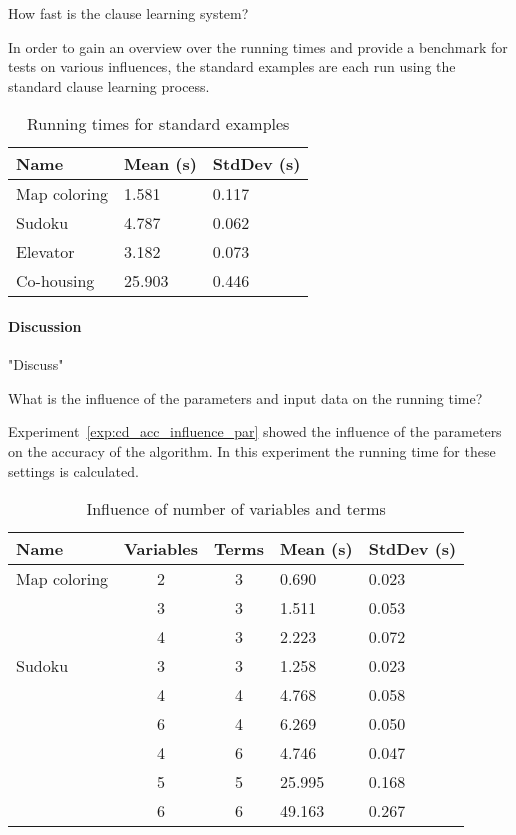 \begin{question}
	How fast is the clause learning system?
\end{question}

\begin{experiment}
	In order to gain an overview over the running times and provide a benchmark for tests on various influences, the standard examples are each run using the standard clause learning process.
	
	\begin{table}[!htp]
		\begin{tabularx}{\textwidth}{XXX}
			\textbf{Name}	& \textbf{Mean (s)}	& \textbf{StdDev (s)} \\
			\toprule
			Map coloring 	& 1.581				& 0.117 \\
			Sudoku 			& 4.787				& 0.062 \\
			Elevator 		& 3.182 			& 0.073 \\
			Co-housing 		& 25.903			& 0.446
		\end{tabularx}
		\label{tbl:exp_speed_standard}
		\caption{Running times for standard examples}
	\end{table}

\end{experiment}

\paragraph{Discussion}
"Discuss"

\begin{question}
	What is the influence of the parameters and input data on the running time?
\end{question}

\begin{experiment}
	Experiment~\ref{exp:cd_acc_influence_par} showed the influence of the parameters on the accuracy of the algorithm.
	In this experiment the running time for these settings is calculated.

	\begin{table}[!htp]
		\begin{tabularx}{\textwidth}{lcc|XX}
			\textbf{Name} & \textbf{Variables} & \textbf{Terms}	& \textbf{Mean (s)} & \textbf{StdDev (s)} \\
			\toprule
			Map coloring 	& 2 & 3 & 0.690		& 0.023	\\
							& 3 & 3 & 1.511		& 0.053	\\
							& 4 & 3 & 2.223		& 0.072	\\
			\midrule	
			Sudoku 			& 3 & 3 & 1.258		& 0.023	\\
							& 4 & 4 & 4.768		& 0.058	\\
							& 6 & 4 & 6.269		& 0.050	\\
							& 4 & 6 & 4.746		& 0.047	\\
							& 5 & 5 & 25.995	& 0.168	\\
							& 6 & 6 & 49.163	& 0.267
		\end{tabularx}
		\label{tbl:cd_speed_influence}
		\caption{Influence of number of variables and terms}
	\end{table}

\end{experiment}


